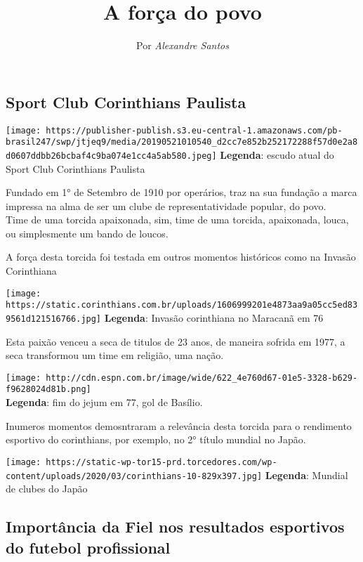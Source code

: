 \documentclass[
]{article}
\title{A força do povo}
\author{Por \emph{Alexandre Santos}}
\date{}
\begin{document}
\maketitle

{
\setcounter{tocdepth}{2}
\tableofcontents
}
\hypertarget{sport-club-corinthians-paulista}{%
\subsection{Sport Club Corinthians
Paulista}\label{sport-club-corinthians-paulista}}

\texttt{[image: https://publisher-publish.s3.eu-central-1.amazonaws.com/pb-brasil247/swp/jtjeq9/media/20190521010540\_d2cc7e852b252172288f57d0e2a8d0607ddbb26bcbaf4c9ba074e1cc4a5ab580.jpeg]}
\textbf{Legenda}: escudo atual do Sport Club Corinthians Paulista

Fundado em 1° de Setembro de 1910 por operários, traz na sua fundação a
marca impressa na alma de ser um clube de representatividade popular, do
povo.\\
Time de uma torcida apaixonada, sim, time de uma torcida, apaixonada,
louca, ou simplesmente um bando de loucos.

A força desta torcida foi testada em outros momentos históricos como na
Invasão Corinthiana

\texttt{[image: https://static.corinthians.com.br/uploads/1606999201e4873aa9a05cc5ed839561d121516766.jpg]}
\textbf{Legenda}: Invasão corinthiana no Maracanã em 76

Esta paixão venceu a seca de titulos de 23 anos, de maneira sofrida em
1977, a seca transformou um time em religião, uma nação.

\texttt{[image: http://cdn.espn.com.br/image/wide/622\_4e760d67-01e5-3328-b629-f9628024d81b.png]}\\
\textbf{Legenda}: fim do jejum em 77, gol de Basílio.

Inumeros momentos demosntraram a relevância desta torcida para o
rendimento esportivo do corinthians, por exemplo, no 2° título mundial
no Japão.

\texttt{[image: https://static-wp-tor15-prd.torcedores.com/wp-content/uploads/2020/03/corinthians-10-829x397.jpg]}
\textbf{Legenda}: Mundial de clubes do Japão

\hypertarget{importuxe2ncia-da-fiel-nos-resultados-esportivos-do-futebol-profissional}{%
\subsection{Importância da Fiel nos resultados esportivos do futebol
profissional}\label{importuxe2ncia-da-fiel-nos-resultados-esportivos-do-futebol-profissional}}
\end{document}
